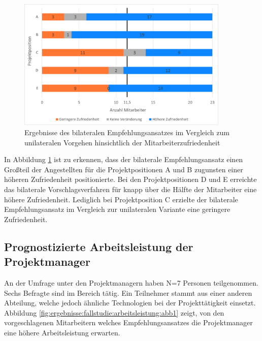 \begin{figure}[h]
	\centering
	\includegraphics[width=0.9\textwidth]{gfx/zufriedenheit-projekte.png}	
	\caption{Ergebnisse des bilateralen Empfehlungsansatzes im Vergleich zum unilateralen Vorgehen hinsichtlich der Mitarbeiterzufriedenheit}
	\label{fig:ergebnisse:analyse:abb7}
\end{figure}

In Abbildung \ref{fig:ergebnisse:analyse:abb7} ist zu erkennen, dass der bilaterale Empfehlungsansatz einen Großteil der Angestellten für die Projektpositionen A und B zugunsten einer höheren Zufriedenheit positionierte. Bei den Projektpositionen D und E erreichte das bilaterale Vorschlagsverfahren für knapp über die Hälfte der Mitarbeiter eine höhere Zufriedenheit. Lediglich bei Projektposition C erzielte der bilaterale Empfehlungsansatz im Vergleich zur unilateralen Variante eine geringere Zufriedenheit.

\subsection{Prognostizierte Arbeitsleistung der Projektmanager}
\label{ch:ergebnisse:fallstudie:arbeitsleistung}
An der Umfrage unter den Projektmanagern haben N=7 Personen teilgenommen. Sechs Befragte sind im Bereich \JES tätig. Ein Teilnehmer stammt aus einer anderen Abteilung, welche jedoch ähnliche Technologien bei der Projekttätigkeit einsetzt. Abbildung \ref{fig:ergebnisse:fallstudie:arbeitsleistung:abb1} zeigt, von den vorgeschlagenen Mitarbeitern welches Empfehlungsansatzes die Projektmanager eine höhere Arbeitsleistung erwarten.

